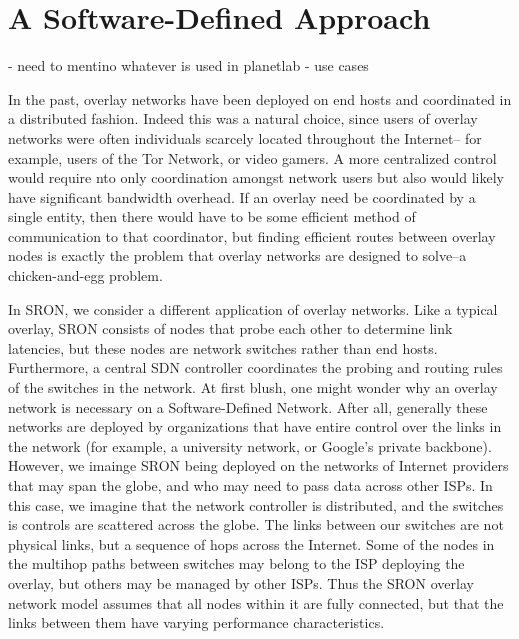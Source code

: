 \documentclass[pageno]{jpaper}
\begin{document}
\section{A Software-Defined Approach}
- need to mentino whatever is used in planetlab
- use cases

In the past, overlay networks have been deployed on end hosts and coordinated 
in a distributed fashion.  Indeed this was a natural choice, since users of 
overlay networks were often individuals scarcely located throughout the Internet--
for example, users of the Tor Network, or video gamers.  A more centralized control
would require nto only coordination amongst network users but also would likely have 
significant bandwidth overhead.  If an overlay need be coordinated by a single entity,
then there would have to be some efficient method of communication to that coordinator, but finding efficient routes between overlay nodes is exactly the problem that overlay networks are designed to solve--a chicken-and-egg problem.  

In SRON, we consider a different application of overlay networks. Like a typical overlay,
SRON consists of nodes that probe each other to determine link latencies, but these nodes
are network switches rather than end hosts. Furthermore, a central SDN controller coordinates 
the probing and routing rules of the switches in the network. At first blush, one might 
wonder why an overlay network is necessary on a Software-Defined Network. After all, generally
these networks are deployed by organizations that have entire control over the links in the 
network (for example, a university network, or Google's private backbone). However, we imainge
SRON being deployed on the networks of Internet providers that may span the globe, and who may
need to pass data across other ISPs. In this case, we imagine that the network controller is 
distributed, and the switches is controls are scattered across the globe. The links between 
our switches are not physical links, but a sequence of hops across the Internet. Some of the 
nodes in the multihop paths between switches may belong to the ISP deploying the overlay, 
but others may be managed by other ISPs.  Thus the SRON overlay network model assumes that all
nodes within it are fully connected, but that the links between them have varying performance 
characteristics.
\end{document}
